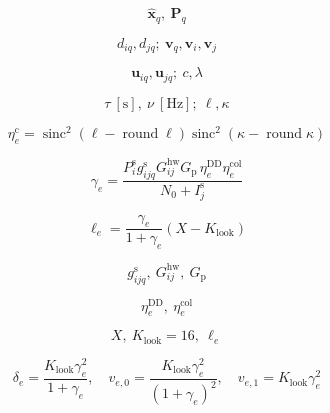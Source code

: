 \documentclass[12pt]{article}
\begin{document}
\begin{equation*}\displaystyle \widehat{\mathbf x}_q,\ \mathbf P_q\end{equation*}

\begin{equation*}\displaystyle d_{iq},d_{jq};\ \mathbf v_q,\mathbf v_i,\mathbf v_j\end{equation*}

\begin{equation*}\displaystyle \mathbf u_{iq},\mathbf u_{jq};\ c,\lambda\end{equation*}

\begin{equation*}\displaystyle \tau\ [\mathrm s],\ \nu\ [\mathrm{Hz}];\ \ell,\kappa\end{equation*}

\begin{equation*}\displaystyle \eta_e^{\mathrm c}=\operatorname{sinc}^2\!\left(\ell-\operatorname{round}\ell\right)\operatorname{sinc}^2\!\left(\kappa-\operatorname{round}\kappa\right)\end{equation*}

\begin{equation*}\displaystyle \gamma_e=\frac{P_i^{\mathrm s}g_{ijq}^{\mathrm s}G_{ij}^{\mathrm{hw}}G_{\mathrm p}\,\eta_e^{\mathrm{DD}}\eta_e^{\mathrm{col}}}{N_0+I_j^{\mathrm s}}\end{equation*}

\begin{equation*}\displaystyle \ell_e=\frac{\gamma_e}{1+\gamma_e}\left(X-K_{\mathrm{look}}\right)\end{equation*}

\begin{equation*}\displaystyle g_{ijq}^{\mathrm s},\ G_{ij}^{\mathrm{hw}},\ G_{\mathrm p}\end{equation*}

\begin{equation*}\displaystyle \eta_e^{\mathrm{DD}},\ \eta_e^{\mathrm{col}}\end{equation*}

\begin{equation*}\displaystyle X,\ K_{\mathrm{look}}=16,\ \ell_e\end{equation*}

\begin{equation*}\displaystyle \delta_e=\frac{K_{\mathrm{look}}\gamma_e^2}{1+\gamma_e},\quad v_{e,0}=\frac{K_{\mathrm{look}}\gamma_e^2}{(1+\gamma_e)^2},\quad v_{e,1}=K_{\mathrm{look}}\gamma_e^2\end{equation*}
\end{document}
